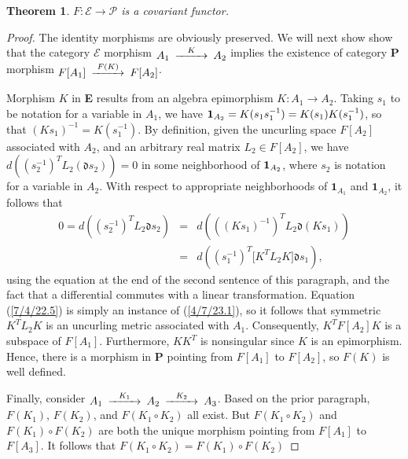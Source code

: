 \documentclass{amsart}
\numberwithin{equation}{section}
\newtheorem{theorem}{Theorem}
\theoremstyle{definition}
\numberwithin{theorem}{section}
\begin{document}
\begin{theorem}\label{6/13/22.1}  $F: \mathcal{E}\rightarrow \mathcal{P}$ is a covariant functor. 
 \end{theorem}
 \begin{proof}  The identity morphisms are obviously preserved.
We will next show show that the category $\mathcal{E}$ morphism $ \begin{CD}  A_1 @>K>> A_2\end{CD}$ implies the existence of category {\bf P} morphism $ \begin{CD}  F[A_1] @>F(K)>> F[A_2]\end{CD}$.

Morphism $K$ in {\bf E} results from an algebra epimorphism $K:A_1\rightarrow A_2$.   Taking $s_1$ to be notation for a variable in $A_1$, we have ${\bf 1}_{A_2} = K(s_1s_1^{-1}) = K(s_1)K(s_1^{-1})$, so that $(Ks_1)^{-1} = K(s_1^{-1})$.  By definition, given the uncurling space $F[A_2]$ associated with $A_2$, and an arbitrary real matrix  $L_2 \in F[A_2]$, we have $d\left((s_2^{-1})^TL_2 (\mathfrak{d}s_2)\right) = 0$ in some neighborhood of ${\bf 1}_{A_2}$, where $s_2$ is notation for a variable in $A_2$.   With respect to appropriate neighborhoods of $\mathbf{1}_{A_1}$ and $\mathbf{1}_{A_2}$, it follows that \begin{eqnarray}\nonumber 0 = d\left((s_2^{-1})^TL_2 \mathfrak{d}s_2\right) &=&  d\left(((Ks_1)^{-1})^TL_2 \mathfrak{d}(Ks_1)\right) \\  &=& d\left((s_1^{-1})^T \big[K^T L_2K\big]\mathfrak{d}s_1\right), \label{7/4/22.5}  \end{eqnarray}   using the equation at the end of the second sentence of this paragraph, and the fact that a differential commutes with a linear transformation.  Equation (\ref{7/4/22.5}) is simply an instance of (\ref{4/7/23.1}), so it follows that symmetric $K^T L_2K$ is an uncurling metric associated with $A_1$.  
 Consequently, $K^TF[A_2]K$ is a subspace of $F[A_1]$.  Furthermore, $KK^T$ is nonsingular since $K$ is an epimorphism.  Hence, there is a morphism in {\bf P} pointing from $F[A_1]$ to $F[A_2]$, so $F(K)$ is well defined.

Finally, consider $\begin{CD}  A_1 @>K_1>> A_2 @>K_2>> A_3 \end{CD}$.  Based on the prior paragraph, $F(K_1)$, $F(K_2)$, and $F(K_1\circ K_2)$ all exist.  But $F(K_1\circ K_2)$ and  $F(K_1)\circ F(K_2)$ are both the unique morphism pointing from $F[A_1]$ to $F[A_3]$.  It follows that $F(K_1\circ K_2) = F(K_1)\circ F(K_2)$
\end{proof}
\end{document}
